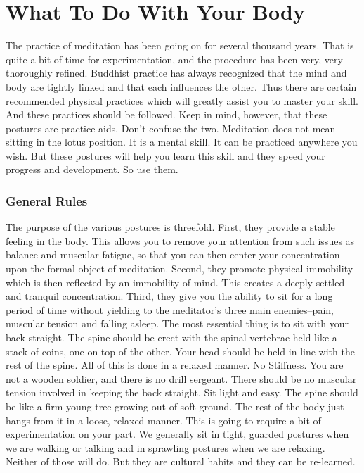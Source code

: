 \chapter{ What To Do With Your Body} 
The practice of meditation has been going
on for several thousand years. That is quite a bit of time for experimentation,
and the procedure has been very, very thoroughly refined. Buddhist practice has
always recognized that the mind and body are tightly linked and that each
influences the other. Thus there are certain recommended physical practices
which will greatly assist you to master your skill. And these practices should
be followed. Keep in mind, however, that these postures are practice aids. Don't
confuse the two. Meditation does not mean sitting in the lotus position. It is a
mental skill. It can be practiced anywhere you wish. But these postures will
help you learn this skill and they speed your progress and development. So use
them.

\subsection*{General Rules} 
The purpose of the various postures is threefold. First, they
provide a stable feeling in the body. This allows you to remove your attention
from such issues as balance and muscular fatigue, so that you can then center
your concentration upon the formal object of meditation. Second, they promote
physical immobility which is then reflected by an immobility of mind. This
creates a deeply settled and tranquil concentration. Third, they give you the
ability to sit for a long period of time without yielding to the meditator's
three main enemies--pain, muscular tension and falling asleep. The most
essential thing is to sit with your back straight. The spine should be erect
with the spinal vertebrae held like a stack of coins, one on top of the other.
Your head should be held in line with the rest of the spine. All of this is done
in a relaxed manner. No Stiffness. You are not a wooden soldier, and there is no
drill sergeant. There should be no muscular tension involved in keeping the back
straight. Sit light and easy. The spine should be like a firm young tree growing
out of soft ground. The rest of the body just hangs from it in a loose, relaxed
manner. This is going to require a bit of experimentation on your part. We
generally sit in tight, guarded postures when we are walking or talking and in
sprawling postures when we are relaxing. Neither of those will do. But they are
cultural habits and they can be re-learned.

